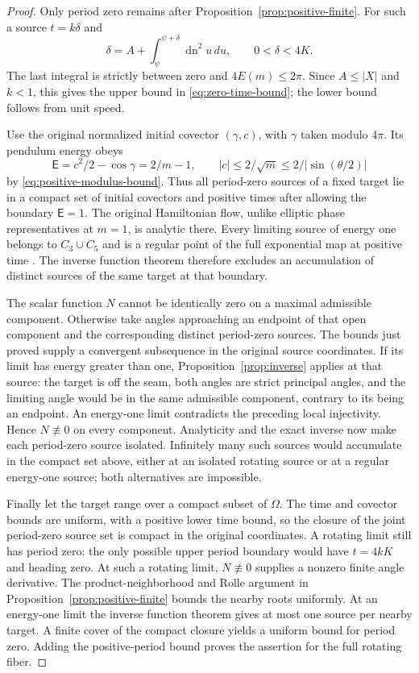\documentclass[11pt,a4paper]{article}
\theoremstyle{remark}\newtheorem{remark}[theorem]{Remark}
\newcommand{\dn}{\operatorname{dn}}
\begin{document}
\begin{proof}
Only period zero remains after Proposition~\ref{prop:positive-finite}.
For such a source $t=k\delta$ and
\[
 \delta=A+\int_{\psi}^{\psi+\delta}\dn^2u\,du,
 \qquad 0<\delta<4K.
\]
The last integral is strictly between zero and $4E(m)\le2\pi$.
Since $A\le|X|$ and $k<1$, this gives the upper bound in
\eqref{eq:zero-time-bound}; the lower bound follows from unit speed.

Use the original normalized initial covector $(\gamma,c)$, with
$\gamma$ taken modulo $4\pi$. Its pendulum energy obeys
\[
 \mathsf E=c^2/2-\cos\gamma=2/m-1,
 \qquad |c|\le2/\sqrt m\le2/|\sin(\theta/2)|
\]
by \eqref{eq:positive-modulus-bound}. Thus all period-zero sources of
a fixed target lie in a compact set of initial covectors and positive
times after allowing the boundary $\mathsf E=1$. The original
Hamiltonian flow, unlike elliptic phase representatives at $m=1$,
is analytic there. Every limiting source of energy one belongs to
$C_3\cup C_5$ and is a regular point of the full exponential map at
positive time \cite[Theorem 2.4]{SC}. The inverse function theorem
therefore excludes an accumulation of distinct sources of the same
target at that boundary.

The scalar function $N$ cannot be identically zero on a maximal
admissible component. Otherwise take angles approaching an endpoint
of that open component and the corresponding distinct period-zero
sources. The bounds just proved supply a convergent subsequence in
the original source coordinates. If its limit has energy greater
than one, Proposition~\ref{prop:inverse} applies at that source:
the target is off the seam, both angles are strict principal angles,
and the limiting angle would be in the same admissible component,
contrary to its being an endpoint. An energy-one limit contradicts
the preceding local injectivity. Hence $N\not\equiv0$ on every
component. Analyticity and the exact inverse now make each period-zero
source isolated. Infinitely many such sources would accumulate in the
compact set above, either at an isolated rotating source or at a
regular energy-one source; both alternatives are impossible.

Finally let the target range over a compact subset of $\Omega$.
The time and covector bounds are uniform, with a positive lower time
bound, so the closure of the joint period-zero source set is compact
in the original coordinates. A rotating limit still has period zero:
the only possible upper period boundary would have $t=4kK$ and
heading zero. At such a rotating limit, $N\not\equiv0$ supplies a
nonzero finite angle derivative. The product-neighborhood and Rolle
argument in Proposition~\ref{prop:positive-finite} bounds the nearby
roots uniformly. At an energy-one limit the inverse function theorem
gives at most one source per nearby target. A finite cover of the
compact closure yields a uniform bound for period zero. Adding the
positive-period bound proves the assertion for the full rotating fiber.
\end{proof}
\end{document}
